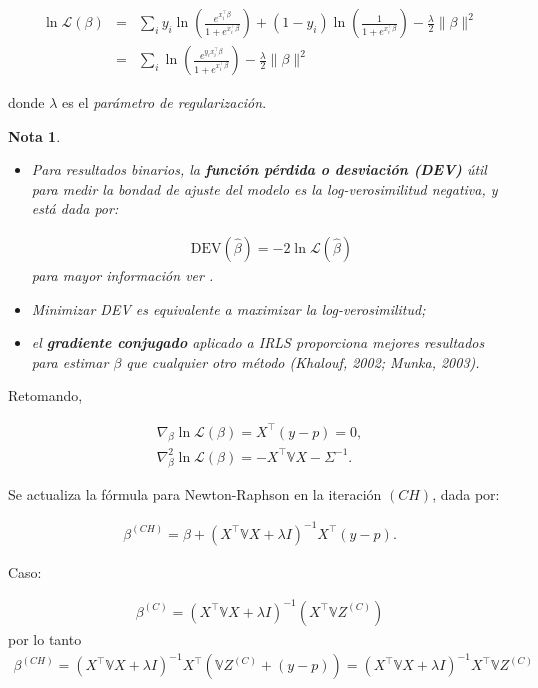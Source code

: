 \documentclass[12pt]{article}
\newtheorem{Note}{Nota}%
\begin{document}
\begin{eqnarray*}
\ln \mathcal{L}(\beta) &=& \sum_i y_i \ln \left( \frac{e^{x_i^\top \beta}}{1 + e^{x_i^\top \beta}} \right) + (1 - y_i) \ln \left( \frac{1}{1 + e^{x_i^\top \beta}} \right)
- \frac{\lambda}{2} \| \beta \|^2\\
&=& \sum_i \ln \left( \frac{e^{y_i x_i^\top \beta}}{1 + e^{x_i^\top \beta}} \right) - \frac{\lambda}{2} \| \beta \|^2
\end{eqnarray*}

\noindent donde $\lambda$  es el \textit{parámetro de regularización}.


\begin{Note}
\begin{itemize}
\item Para resultados binarios, la \textbf{función pérdida o desviación (DEV)} útil para medir la bondad de ajuste del modelo es la log-verosimilitud negativa, y está dada por:

\begin{eqnarray*}
\mathrm{DEV}(\hat{\beta}) = -2 \ln \mathcal{L}(\hat{\beta})
\end{eqnarray*}
para mayor informaci\'on ver \cite{hosmer2000}. 
\item Minimizar DEV es equivalente a maximizar la log-verosimilitud; 
\item el \textbf{gradiente conjugado} aplicado a IRLS proporciona mejores resultados para estimar $\beta$ que cualquier otro método (Khalouf, 2002; Munka, 2003).
\end{itemize}
\end{Note}

Retomando,

\begin{eqnarray*}
\nabla_\beta \ln \mathcal{L}(\beta) = X^\top (y - p) = 0,\\
\nabla_\beta^2 \ln \mathcal{L}(\beta) = -X^\top \mathbb{V} X - \Sigma^{-1}.
\end{eqnarray*}

Se actualiza la fórmula para Newton-Raphson en la iteración $(CH)$, dada por:

\begin{eqnarray*}
\beta^{(CH)} = \beta + \left( X^\top \mathbb{V} X + \lambda I \right)^{-1} X^\top \left( y - p \right).
\end{eqnarray*}

Caso:

\begin{eqnarray}
\beta^{(C)} = \left( X^\top \mathbb{V} X + \lambda I \right)^{-1} \left( X^\top \mathbb{V} Z^{(C)} \right)
\end{eqnarray}
por lo tanto
\begin{eqnarray}
\beta^{(CH)} = \left( X^\top \mathbb{V} X + \lambda I \right)^{-1} X^\top \left( \mathbb{V} Z^{(C)} + (y - p) \right)= \left( X^\top \mathbb{V} X + \lambda I \right)^{-1} X^\top \mathbb{V} Z^{(C)}
\end{eqnarray}
\end{document}
